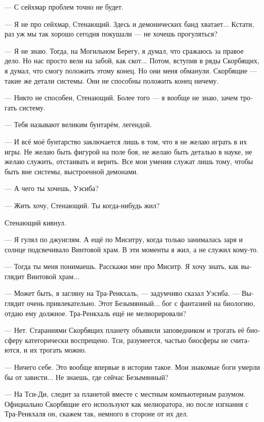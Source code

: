 \documentclass[a4paper,12pt,fleqn]{book}\usepackage{cooltooltips}\usepackage{polyglossia}\setdefaultlanguage[babelshorthands=true]{russian}\setotherlanguage{english}\defaultfontfeatures{Ligatures=TeX,Mapping=tex-text} \usepackage{xcolor}\definecolor{lightgray}{HTML}{bbbbbb}\color{lightgray}\newcommand{\ml}[3]{\textenglish{\textcolor{black}{#3}}}
\newcommand{\asterism}{\vspace{1em}{\centering\Large\bfseries$\ast~\ast~\ast$\par}\vspace{1em}}
\begin{document}
--- С сейхмар проблем точно не будет.

--- Я не про сейхмар, Стенающий.
Здесь и демонических банд хватает...
Кстати, раз уж мы так хорошо сегодня покушали --- не хочешь прогуляться?

\asterism

--- Я не знаю.
Тогда, на Могильном Берегу, я думал, что сражаюсь за правое дело.
Но нас просто вели на забой, как скот...
Потом, вступив в ряды Скорбящих, я думал, что смогу положить этому конец.
Но они меня обманули.
Скорбящие --- такие же детали системы.
Они не способны положить конец ничему.

--- Никто не способен, Стенающий.
Более того --- я вообще не знаю, зачем трогать систему.

--- Тебя называют великим бунтарём, легендой.

--- И всё моё бунтарство заключается лишь в том, что я не желаю играть в их игры.
Не желаю быть фигурой на поле боя, не желаю быть деталью в науке, не желаю служить, отстаивать и верить.
Все мои умения служат лишь тому, чтобы быть вне системы, выстроенной демонами.

--- А чего ты хочешь, Уэсиба?

--- Жить хочу, Стенающий.
Ты когда-нибудь жил?

Стенающий кивнул.

--- Я гулял по джунглям.
А ещё по Миситру, когда только занималась заря и солнце подсвечивало Винтовой храм.
В эти моменты я жил, а не служил кому-то.

--- Тогда ты меня понимаешь.
Расскажи мне про Миситр.
Я хочу знать, как выглядит Винтовой храм...

\asterism

--- Может быть, я загляну на Тра-Ренкхаль, --- задумчиво сказал Уэсиба.
--- Выглядит очень привлекательно.
Этот Безымянный... бог с фантазией на биологию, отдаю ему должное.
Тра-Ренкхаль ещё не мелиорировали?

--- Нет.
Стараниями Скорбящих планету объявили заповедником и трогать её биосферу категорически воспрещено.
Тси, разумеется, частью биосферы не считаются, и их трогать можно.

--- Ничего себе.
Это вообще впервые в истории такое.
Мои знакомые боги умерли бы от зависти...
Не знаешь, где сейчас Безымянный?

--- На Тси-Ди, следит за планетой вместе с местным компьютерным разумом.
Официально Скорбящие его используют как мелиоратора, но после изгнания с Тра-Ренкхаля он, скажем так, немного в стороне от их дел.
\end{document}
